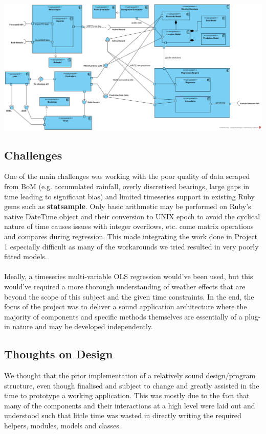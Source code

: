\documentclass[10pt]{article}
\begin{document}
\includegraphics[scale=0.45]{P3_component_modified.png}

\newpage

\subsection*{Challenges}

\noindent One of the main challenges was working with the poor quality of data scraped from BoM (e.g. accumulated rainfall, overly discretised bearings, large gaps in time leading to significant bias) and limited timeseries support in existing Ruby gems such as \textbf{statsample}. Only basic arithmetic may be performed on Ruby's native DateTime object and their conversion to UNIX epoch to avoid the cyclical nature of time causes issues with integer overflows, etc. come matrix operations and compares during regression. This made integrating the work done in Project 1 especially difficult as many of the workarounds we tried resulted in very poorly fitted models. \\\\
Ideally, a timeseries multi-variable OLS regression would've been used, but this would've required a more thorough understanding of weather effects that are beyond the scope of this subject and the given time constraints. In the end, the focus of the project was to deliver a sound application architecture where the majority of components and specific methods themselves are essentially of a plug-in nature and may be developed independently.

\subsection*{Thoughts on Design}

\noindent We thought that the prior implementation of a relatively sound design/program structure, even though finalised and subject to change and greatly assisted in the time to prototype a working application. This was mostly due to the fact that many of the components and their interactions at a high level were laid out and understood such that little time was wasted in directly writing the required helpers, modules, models and classes.
\end{document}

